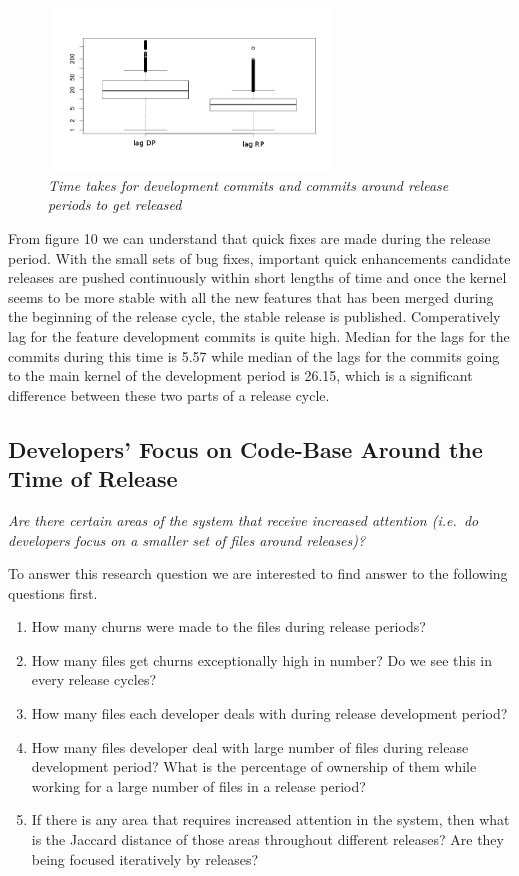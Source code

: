 \documentclass{acm_proc_article-sp}
\begin{document}
\begin{figure}
\begin{center}
\includegraphics[height=1.7in,width=3in]{lagMPRPbox.png}
\caption{\small \sl Time takes for development commits and commits around release periods to get released}
\end{center}
\end{figure}

From figure 10 we can understand that quick fixes are made during the release period. With the small sets of bug fixes, important quick enhancements candidate releases are pushed continuously within short lengths of time and once the kernel seems to be more stable with all the new features that has been merged during the beginning of the release cycle, the stable release is published. Comperatively lag for the feature development commits is quite high. Median for the lags for the commits during this time is 5.57 while median of the lags for the commits going to the main kernel of the development  period is 26.15, which is a significant difference between these two parts of a release cycle.

\subsection{Developers' Focus on Code-Base Around the Time of Release}
\textit{Are there certain areas of the system that receive increased attention (i.e.\ do developers focus on a smaller set of files around releases)?}

To answer this research question we are interested to find answer to the following questions first.
\renewcommand{\labelenumi}{q\theenumi:}
\begin{enumerate}
\item{How many churns were made to the files during release periods?}
\item{How many files get churns exceptionally high in number? Do we see this in every release cycles?}
\item{How many files each developer deals with during release development period?}
\item{How many files developer deal with large number of files during release development period? What is the percentage of ownership of them while working for a large number of files in a release period?}
\item{If there is any area that requires increased attention in the system, then what is the Jaccard distance of those areas throughout different releases? Are they being focused iteratively by releases?}
\end{enumerate}
\end{document}
